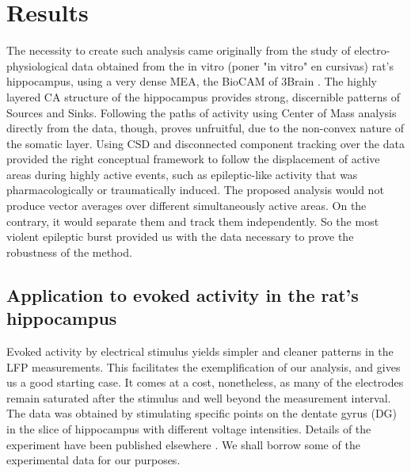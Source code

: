 \documentclass[utf8]{frontiersSCNS}
\begin{document}
 
\section{Results}

The necessity to create such analysis came originally from the study of
electro-physiological data obtained from the in vitro (poner "in vitro" en cursivas) rat's hippocampus, using
a very dense MEA, the BioCAM of 3Brain \citep{BioCam}. 
The highly layered CA structure of the hippocampus provides strong, discernible patterns of Sources and Sinks. Following the paths of activity using Center of Mass analysis directly from the data, though, proves unfruitful, due to the non-convex nature of the somatic layer. Using CSD and disconnected component tracking over the data provided the right conceptual framework to follow the displacement of active areas during highly active events, such as epileptic-like activity that was pharmacologically
or traumatically induced. The proposed analysis would not produce vector averages over different simultaneously active areas. On the contrary, it would separate them and track them independently. So the most violent epileptic burst provided us with the data necessary to prove the robustness of the method.
 



\subsection{Application to evoked activity in the rat's hippocampus}\label{sec:evocada}

Evoked activity by electrical stimulus yields simpler and cleaner patterns in the LFP
measurements. This facilitates the exemplification of our analysis, and gives us
a good starting case. It comes at a cost, nonetheless, as many of the electrodes
remain saturated after the stimulus and well beyond the measurement interval.
The data was obtained by stimulating  specific points on the dentate gyrus
(DG) in the slice of hippocampus with different voltage intensities. Details of the experiment
have been published elsewhere \citep{Franco2018}. We shall borrow some of
the experimental data for our purposes.
\end{document}
